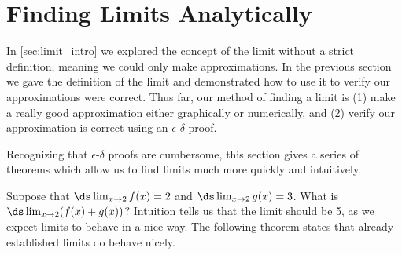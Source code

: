 \section{Finding Limits Analytically}\label{sec:limit_analytically}

In \autoref{sec:limit_intro} we explored the concept of the limit without a strict definition, meaning we could only make approximations. In the previous section we gave the definition of the limit and demonstrated how to use it to verify our approximations were correct. Thus far, our method of finding a limit is (1) make a really good approximation either graphically or numerically, and (2) verify our approximation is correct using an $\epsilon$-$\delta$ proof.

Recognizing that $\epsilon$-$\delta$ proofs are cumbersome, this section gives a series of theorems which allow us to find limits much more quickly and intuitively. \bigskip

Suppose that $\ds\lim_{x\to 2} f(x)=2$ and $\ds\lim_{x\to 2} g(x) = 3$. What is $\ds\lim_{x\to 2}(f(x)+g(x))$? Intuition tells us that the limit should be 5, as we expect limits to behave in a nice way. The following theorem states that already established limits do behave nicely.


